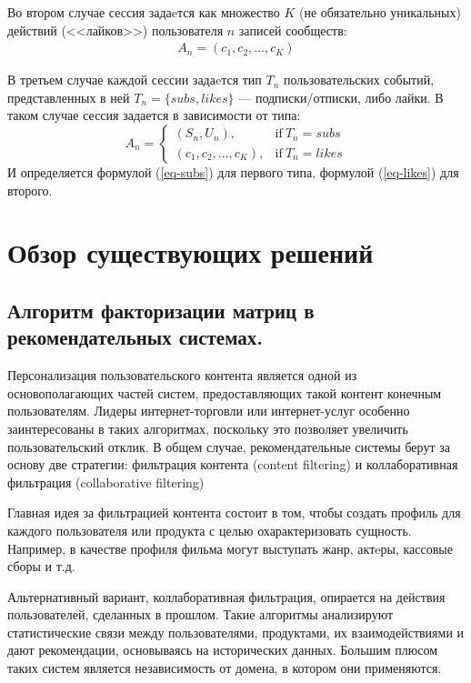 \documentclass[times,specification,annotation]{itmo-student-thesis}
\begin{document}
Во втором случае сессия задаeтся как множество $K$ (не обязательно уникальных) действий (<<лайков>>) пользователя $n$ записей сообществ:
 \begin{align}
A_n = (c_{1}, c_{2}, \dots, c_{K}) 
\label{eq-likes}
\end{align}
 
В третьем случае каждой сессии задаeтся тип $T_n$ пользовательских событий, представленных в ней $T_n = \{subs, likes\}$ --- подписки/отписки, либо лайки. В таком случае сессия задается в зависимости от типа:
\begin{equation}
    A_n =
    \begin{cases}
      (S_n, U_n), & \text{if}\ T_n=subs \\
      (c_{1}, c_{2}, \dots, c_{K}), & \text{if}\ T_n=likes
    \end{cases}  
    \label{eq-combined}
  \end{equation}
 И определяется формулой (\ref{eq-subs}) для первого типа, формулой (\ref{eq-likes}) для второго.

\section{Обзор существующих решений}

\subsection{Алгоритм факторизации матриц в рекомендательных системах.}\label{sec:als}

Персонализация пользовательского контента является одной из основополагающих частей систем, предоставляющих такой контент конечным пользователям. Лидеры интернет-торговли или интернет-услуг особенно заинтересованы в таких алгоритмах, поскольку это позволяет увеличить пользовательский отклик.
В общем случае, рекомендательные системы берут за основу две стратегии: фильтрация контента (content filtering) \cite{Lops2011,} и коллаборативная фильтрация (collaborative filtering)
  
Главная идея за фильтрацией контента состоит в том, чтобы создать профиль для каждого пользователя или продукта с целью охарактеризовать сущность. Например, в качестве профиля фильма могут выступать жанр, актeры, кассовые сборы и т.д.

Альтернативный вариант, коллаборативная фильтрация, опирается на действия пользователей, сделанных в прошлом. Такие алгоритмы анализируют статистические связи между пользователями, продуктами, их взаимодействиями и дают рекомендации, основываясь на исторических данных.  Большим плюсом таких систем является независимость от домена, в котором они применяются.
\end{document}
